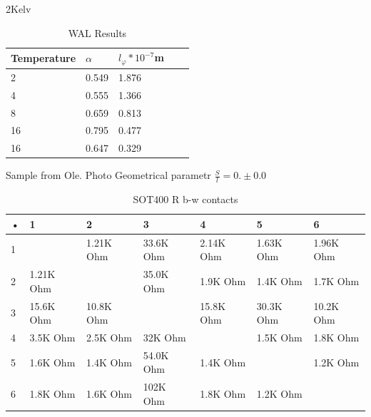 \documentclass[idxtotoc,hyperref,openany,oneside]{labbook} %
\begin{document}
2Kelv
\begin{table}[H]
\begin{tabular}{l l l l l}
\toprule
\textbf{Temperature} & \textbf{$\alpha$} & \textbf{$l_{\varphi}*10^{-7}$m}\\
\toprule
2&  0.549 & 1.876 \\
4&  0.555 & 1.366 \\
8&  0.659 & 0.813 \\
16& 0.795 & 0.477 \\
16& 0.647 & 0.329 \\

\bottomrule
\end{tabular}
\caption{WAL Results}
\label{tab:WAL Results}
\end{table}
Sample from Ole. Photo
\newline
Geometrical parametr $\frac{S}{l}=0.\pm0.0$
\newline
\begin{table}[H]
\begin{tabular}{l l l l l l l}
\toprule
\textbf{•} & \textbf{1} & \textbf{2} & \textbf{3}& \textbf{4}& \textbf{5}& \textbf{6}\\
\toprule
 1&   & 1.21K Ohm & 33.6K Ohm & 2.14K Ohm & 1.63K Ohm & 1.96K Ohm\\
 2 & 1.21K Ohm &  & 35.0K Ohm & 1.9K Ohm & 1.4K Ohm &1.7K Ohm\\
 3 & 15.6K Ohm & 10.8K Ohm & & 15.8K Ohm & 30.3K Ohm & 10.2K Ohm\\
 4 & 3.5K Ohm & 2.5K Ohm &32K Ohm &  & 1.5K Ohm & 1.8K Ohm\\
 5 &1.6K Ohm  & 1.4K Ohm &54.0K Ohm  &1.4K Ohm & &1.2K Ohm  \\
 6 & 1.8K Ohm & 1.6K Ohm &102K Ohm &1.8K Ohm &1.2K Ohm  &\\
\bottomrule
\end{tabular}
\caption{SOT400 R b-w contacts}
\label{tab:SOT 400 R b-w contacts}
\end{table}

\end{document}
